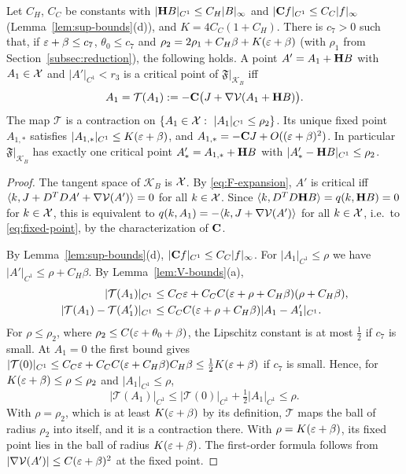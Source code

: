 \begin{proposition}\label{prop:contraction}
Let $C_H$, $C_C$ be constants with $|\mathbf H B|_{C^1}\le C_H|B|_\infty$ and $|\mathbf C f|_{C^1}\le C_C|f|_\infty$ (Lemma~\ref{lem:sup-bounds}(d)), and $K=4C_C(1+C_H)$. There is $c_7>0$ such that, if $\varepsilon+\beta\le c_7$, $\theta_0\le c_7$ and $\rho_2=2\rho_1+C_H\beta+K(\varepsilon+\beta)$ (with $\rho_1$ from Section~\ref{subsec:reduction}), the following holds. A point $A'=A_1+\mathbf H B$ with $A_1\in\mathcal X$ and $|A'|_{C^1}<r_3$ is a critical point of $\mathfrak F|_{\mathcal K_B}$ iff
\begin{equation}\label{eq:fixed-point}
A_1=\mathcal T(A_1):=-\mathbf C\big(J+\nabla\mathcal V(A_1+\mathbf H B)\big).
\end{equation}
The map $\mathcal T$ is a contraction on $\{A_1\in\cX:\ |A_1|_{C^1}\le\rho_2\}$. Its unique fixed point $A_{1,*}$ satisfies $|A_{1,*}|_{C^1}\le K(\varepsilon+\beta)$, and $A_{1,*}=-\mathbf C J+O((\varepsilon+\beta)^2)$. In particular $\mathfrak F|_{\mathcal K_B}$ has exactly one critical point $A'_*=A_{1,*}+\mathbf H B$ with $|A'_*-\mathbf H B|_{C^1}\le\rho_2$.
\end{proposition}

\begin{proof}
The tangent space of $\mathcal K_B$ is $\mathcal X$. By \eqref{eq:F-expansion}, $A'$ is critical iff $\langle k,J+D^TDA'+\nabla\mathcal V(A')\rangle=0$ for all $k\in\mathcal X$. Since $\langle k,D^TD\mathbf H B\rangle=q(k,\mathbf H B)=0$ for $k\in\mathcal X$, this is equivalent to $q(k,A_1)=-\langle k,J+\nabla\mathcal V(A')\rangle$ for all $k\in\mathcal X$, i.e.\ to \eqref{eq:fixed-point}, by the characterization of $\mathbf C$.

By Lemma~\ref{lem:sup-bounds}(d), $|\mathbf C f|_{C^1}\le C_C|f|_\infty$. For $|A_1|_{C^1}\le\rho$ we have $|A'|_{C^1}\le\rho+C_H\beta$. By Lemma~\ref{lem:V-bounds}(a),
\[
\begin{aligned}
|\mathcal T(A_1)|_{C^1}&\le C_C\varepsilon+C_CC(\varepsilon+\rho+C_H\beta)(\rho+C_H\beta),\\
|\mathcal T(A_1)-\mathcal T(A_1')|_{C^1}&\le C_CC(\varepsilon+\rho+C_H\beta)|A_1-A_1'|_{C^1}.
\end{aligned}
\]
For $\rho\le\rho_2$, where $\rho_2\le C(\varepsilon+\theta_0+\beta)$, the Lipschitz constant is at most $\frac12$ if $c_7$ is small. At $A_1=0$ the first bound gives $|\mathcal T(0)|_{C^1}\le C_C\varepsilon+C_CC(\varepsilon+C_H\beta)C_H\beta\le\frac12K(\varepsilon+\beta)$ if $c_7$ is small. Hence, for $K(\varepsilon+\beta)\le\rho\le\rho_2$ and $|A_1|_{C^1}\le\rho$,
\[
|\mathcal T(A_1)|_{C^1}\le|\mathcal T(0)|_{C^1}+\tfrac12|A_1|_{C^1}\le\rho .
\]
With $\rho=\rho_2$, which is at least $K(\varepsilon+\beta)$ by its definition, $\mathcal T$ maps the ball of radius $\rho_2$ into itself, and it is a contraction there. With $\rho=K(\varepsilon+\beta)$, its fixed point lies in the ball of radius $K(\varepsilon+\beta)$. The first-order formula follows from $|\nabla\mathcal V(A')|\le C(\varepsilon+\beta)^2$ at the fixed point.
\end{proof}

